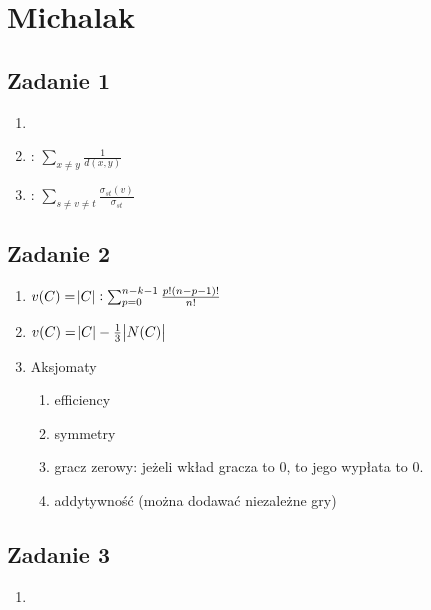 \section{Michalak}

\subsection{Zadanie 1}
\begin{enumerate}
  \item
  \item
    :
        $\sum_{x\neq y}{\frac{1}{d(x,y)}}$
      \item
        :
        $\sum_{s\neq v \neq t} \frac{\sigma_{st}(v)}{\sigma_{st}}$

\end{enumerate}

\subsection{Zadanie 2}
\begin{enumerate}
  \item
    $v(C) = \abs{C}: \sum^{n - k - 1}_{p = 0} \frac{p! (n - p - 1)!}{n!}$
  \item
    $ v(C) = \abs{C} - \frac{1}{3} \abs{N(C)} $
  \item
    Aksjomaty
    \begin{enumerate}
      \item
        efficiency
      \item
        symmetry
      \item
        gracz zerowy: jeżeli wkład gracza to $0$, to jego wypłata to $0$.
      \item
        addytywność (można dodawać niezależne gry)
    \end{enumerate}
\end{enumerate}

\subsection{Zadanie 3}
\begin{enumerate}
  \item
\end{enumerate}

